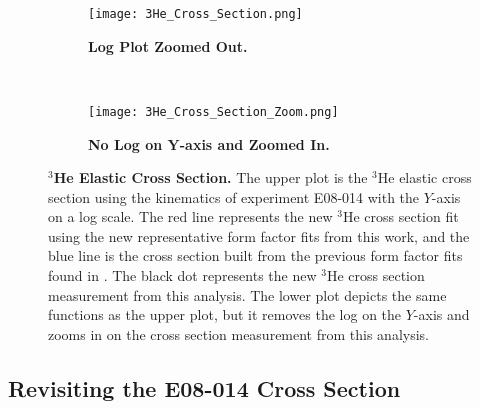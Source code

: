 \begin{figure}[!ht]
\begin{subfigure}{1.\textwidth}
  \centering
  \texttt{[image: 3He\_Cross\_Section.png]}
  \caption{\bf{Log Plot Zoomed Out.}}
  \label{fig:3he_cross_section_no_zoom}
\end{subfigure}\\
\begin{subfigure}{1.\textwidth}
  \centering
  \texttt{[image: 3He\_Cross\_Section\_Zoom.png]}
  \caption{\bf{No Log on $\boldsymbol{Y}$-axis and Zoomed In.}}
  \label{fig:3he_cross_section_zoom}
\end{subfigure}
\caption[$^3$He Elastic Cross Section] {
{\bf{$^3$He Elastic Cross Section.}} The upper plot is the $^3$He elastic cross section using the kinematics of experiment E08-014 with the $Y$-axis on a log scale. The red line represents the new $^3$He cross section fit using the new representative form factor fits from this work, and the blue line is the cross section built from the previous form factor fits found in \cite{Article:Amroun}. The black dot represents the new $^3$He cross section measurement from this analysis. The lower plot depicts the same functions as the upper plot, but it removes the log on the $Y$-axis and zooms in on the cross section measurement from this analysis.}
\label{fig:3he_cross_section}
\end{figure}


\subsection{Revisiting the E08-014 Cross Section}
\label{ssec:xs_revisit}

